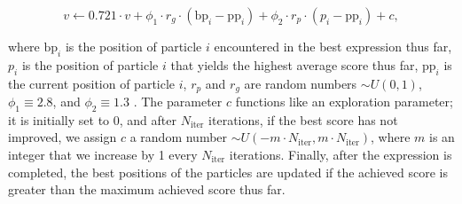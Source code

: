 \documentclass[12pt]{iopart}
\begin{document}
\begin{equation}
		v \gets 0.721\cdot v + \phi_1 \cdot r_g \cdot (\mathrm{bp}_i - \mathrm{pp}_i) + \phi_2\cdot r_p \cdot (p_i - \mathrm{pp}_i) + c,
\end{equation}

where $\mathrm{bp}_i$ is the position of particle $i$ encountered in the best expression thus far, $p_i$ is the position of particle $i$ that yields the highest average score thus far, $\mathrm{pp}_i$ is the current position of particle $i$, $r_p$ and $r_g$ are random numbers $\sim U(0,1)$, $\phi_1 \equiv 2.8$, and $\phi_2 \equiv 1.3$  \cite{offShellPSO}. The parameter $c$ functions like an exploration parameter; it is initially set to 0, and after $N_{\mathrm{iter}}$ iterations, if the best score has not improved, we assign $c$ a random number $\sim U(-m\cdot N_{\mathrm{iter}}, m\cdot N_{\mathrm{iter}})$, where $m$ is an integer that we increase by 1 every $N_{\mathrm{iter}}$ iterations. Finally, after the expression is completed, the best positions of the particles are updated if the achieved score is greater than the maximum achieved score thus far.
\end{document}
